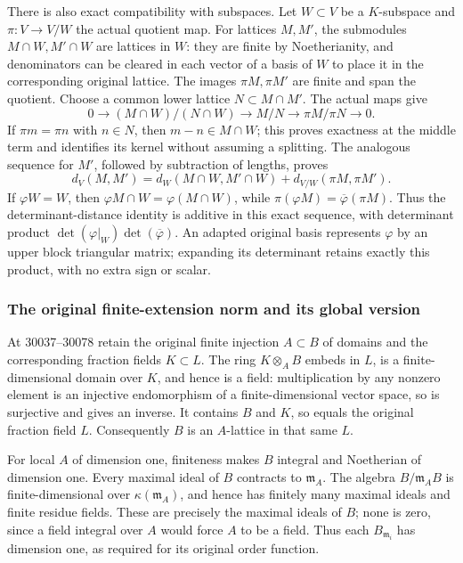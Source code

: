 There is also exact compatibility with subspaces. Let \(W\subset V\) be a \(K\)-subspace and \(\pi:V\to V/W\) the actual quotient map. For lattices \(M,M'\), the submodules \(M\cap W,M'\cap W\) are lattices in \(W\): they are finite by Noetherianity, and denominators can be cleared in each vector of a basis of \(W\) to place it in the corresponding original lattice. The images \(\pi M,\pi M'\) are finite and span the quotient. Choose a common lower lattice \(N\subset M\cap M'\). The actual maps give \[
 0\longrightarrow (M\cap W)/(N\cap W)
 \longrightarrow M/N\longrightarrow \pi M/\pi N\longrightarrow0.
\] If \(\pi m=\pi n\) with \(n\in N\), then \(m-n\in M\cap W\); this proves exactness at the middle term and identifies its kernel without assuming a splitting. The analogous sequence for \(M'\), followed by subtraction of lengths, proves \[
 d_V(M,M')=
 d_W(M\cap W,M'\cap W)+
 d_{V/W}(\pi M,\pi M').
\] If \(\varphi W=W\), then \(\varphi M\cap W=\varphi(M\cap W)\), while \(\pi(\varphi M)=\overline\varphi(\pi M)\). Thus the determinant-distance identity is additive in this exact sequence, with determinant product \(\det(\varphi|_W)\det(\overline\varphi)\). An adapted original basis represents \(\varphi\) by an upper block triangular matrix; expanding its determinant retains exactly this product, with no extra sign or scalar.

\subsubsection{The original finite-extension norm and its global version}\label{the-original-finite-extension-norm-and-its-global-version}

At 30037--30078 retain the original finite injection \(A\subset B\) of domains and the corresponding fraction fields \(K\subset L\). The ring \(K\otimes_A B\) embeds in \(L\), is a finite-dimensional domain over \(K\), and hence is a field: multiplication by any nonzero element is an injective endomorphism of a finite-dimensional vector space, so is surjective and gives an inverse. It contains \(B\) and \(K\), so equals the original fraction field \(L\). Consequently \(B\) is an \(A\)-lattice in that same \(L\).

For local \(A\) of dimension one, finiteness makes \(B\) integral and Noetherian of dimension one. Every maximal ideal of \(B\) contracts to \(\mathfrak m_A\). The algebra \(B/\mathfrak m_AB\) is finite-dimensional over \(\kappa(\mathfrak m_A)\), and hence has finitely many maximal ideals and finite residue fields. These are precisely the maximal ideals of \(B\); none is zero, since a field integral over \(A\) would force \(A\) to be a field. Thus each \(B_{\mathfrak m_i}\) has dimension one, as required for its original order function.

